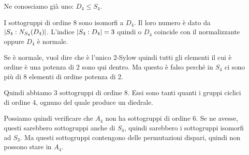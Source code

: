 \begin{soluzione}
    Ne conosciamo già uno: $D_4 \le S_4$.

    I sottogruppi di ordine 8 sono isomorfi a $D_4$.
    Il loro numero è dato da $\lvert S_4:N_{S_4}(D_4) \rvert$.
    L'indice $\lvert S_4:D_4 \rvert = 3$ quindi o $D_4$ coincide con il normalizzante oppure $D_4$ è normale.

    Se è normale, vuol dire che è l'unico 2-Sylow quindi tutti gli elementi il cui è ordine è una potenza di 2 sono qui
    dentro.
    Ma questo è falso perché in $S_4$ ci sono più di 8 elementi di ordine potenza di 2.

    Quindi abbiamo 3 sottogruppi di ordine 8.
    Essi sono tanti quanti i gruppi ciclici di ordine 4, ognuno del quale produce un diedrale.
\end{soluzione}

Possiamo quindi verificare che $A_4$ non ha sottogruppi di ordine 6.
Se ne avesse, questi sarebbero sottogruppi anche di $S_4$, quindi sarebbero i sottogruppi isomorfi ad $S_3$.
Ma questi sottogruppi contengono delle permutazioni dispari, quindi non possono stare in $A_4$.